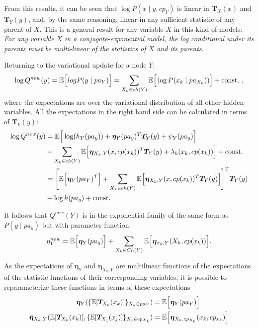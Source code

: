From this results, it can be seen that \( \log P(x \mid y , cp_Y) \) is linear in \( \bm{T}_X(x) \) and \( \bm{T}_Y(y) \), and, by the same reasoning, linear in any sufficient statistic of any parent of \( X \). This is a general result for any variable \( X \) in this kind of models: \emph{For any variable \( X \) in a conjugate-exponential model, the log conditional under its parents must be multi-linear of the statistics of \( X \) and its parents}.

Returning to the variational update for a node \( Y \):
\[
     \log Q^{new}(y) = \E{}{log P(y \mid pa_Y)} = \sum_{X_k \in ch(Y)}\E{}{\log P(x_k \mid pa_{X_k}))} + \text{const.} \ ,
\]
where the expectations are over the variational distribution of all other hidden variables. All the expectations in the right hand side can be calculated in terms of \( \bm{T}_Y(y) \):
\[
    \begin{aligned}
     \log Q^{new}(y) &= \mathbb{E}_{}\Big[\log(h_Y (pa_y)) + \bm{\eta}_Y(pa_y)^T \bm{T}_Y(y) + \psi_Y(pa_y)\Big]\\ 
     &+ \sum_{X_k \in ch(Y)} \mathbb{E}_{}\Big[ \bm{\eta}_{X_k, Y}(x, cp(x_k))^T \bm{T}_Y(y) + \lambda_{k}(x_k, cp(x_k)) \Big] + \text{const.}\\
     &= \Bigg[ \mathbb{E}_{}\Big[\bm{\eta}_Y(pa_Y)^T\Big] + \sum_{X_k \in ch(Y)} \mathbb{E}_{}\Big[ \bm{\eta}_{X_k, Y}(x, cp(x_k))^T \bm{T}_Y(y)\Big]  \Bigg]^T \bm{T}_Y(y) \\
     & + \log h(pa_y)+ \text{const.}
    \end{aligned}   
\]

It follows that \( Q^{new}(Y) \) is in the exponential family of the same form as \( P(y \mid pa_y) \) but with parameter function
\[
     \eta^{new}_Y = \mathbb{E}_{}\Big[\bm{\eta}_Y(pa_y)\Big] + \sum_{X_k \in Ch(Y)}\mathbb{E}_{}\Big[\bm{\eta}_{x_k, Y}(X_k, cp(x_k))\Big].
\] 

As the expectations of \( \bm{\eta}_Y \) and \( \bm{\eta}_{X_k, Y} \) are multilinear functions of the expectations of the statistic functions of their corresponding variables, it is possible to reparameterize these functions in terms of these expectations
\[
     \begin{aligned}
     \bar{\bm{\eta}}_Y (\{ \mathbb{E}[{\bm{T}_{X_k}}(x_k)] \}_{X_k \in pa_Y}) &= \mathbb{E}_{}\Big[\bm{\eta}_Y(pa_Y)\Big]\\
     \bar{\bm{\eta}}_{X_k,Y} (  \mathbb{E}[\bm{T}_{X_k}(x_k)], \{ \mathbb{E}[{\bm{T}_{X_j}}(x_j)] \}_{X_j \in cp_{X_k}}) &= \mathbb{E}_{}\Big[\bm{\eta}_{X_k, cp_{X_k}}(x_k, cp_{x_k})\Big]\\
     \end{aligned}
\] 

